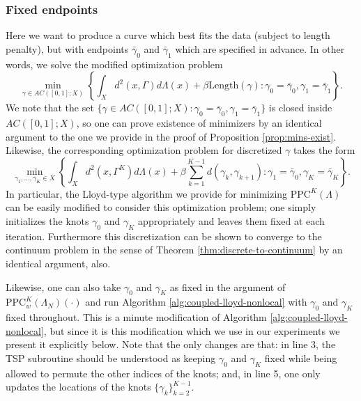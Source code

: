 \documentclass[aos, preprint]{imsart}
\theoremstyle{plain}
\theoremstyle{remark}
\begin{document}
\begin{appendix}
\subsubsection*{Fixed endpoints} Here we want to produce a
curve which best fits the data (subject to length penalty), but with
endpoints $\bar{\gamma}_{0}$ and $\bar{\gamma}_{1}$ which are specified
in advance. In other words, we solve the modified optimization problem
\[
\min_{\gamma\in AC([0,1];X)}\left\{ \int_{X}d^{2}(x,\Gamma)d\Lambda(x)+\beta\text{Length}(\gamma):\gamma_{0}=\bar{\gamma}_{0},\gamma_{1}=\bar{\gamma}_{1}\right\} .
\]
We note that the set $\{\gamma\in AC([0,1];X):\gamma_{0}=\bar{\gamma}_{0},\gamma_{1}=\bar{\gamma}_{1}\}$
is closed inside $AC([0,1];X)$, so
one can prove existence of minimizers by an identical argument to
the one we provide in the proof of Proposition \ref{prop:mins-exist}.
Likewise, the corresponding optimization problem for discretized $\gamma$
takes the form
\[
\min_{\gamma_{1},\ldots,\gamma_{K}\in X}\left\{ \int_{X}d^{2}(x,\Gamma^{K})d\Lambda(x)+\beta\sum_{k=1}^{K-1}d(\gamma_{k},\gamma_{k+1}):\gamma_{1}=\bar{\gamma}_{0},\gamma_{K}=\bar{\gamma}_{K}\right\} .
\]
In particular, the Lloyd-type algorithm we provide for minimizing
$\text{PPC}^{K}(\Lambda)$ can be easily modified to consider this
optimization problem; one simply initializes the knots $\gamma_{0}$
and $\gamma_{K}$ appropriately and leaves them fixed at each iteration. Furthermore this discretization can be shown to converge to the continuum problem in the sense of Theorem \ref{thm:discrete-to-continuum} by an identical argument, also.

Likewise, one can also take $\gamma_0$ and $\gamma_K$ as fixed in the argument of $\text{PPC}_w^K(\Lambda_N)(\cdot)$ and run Algorithm \ref{alg:coupled-lloyd-nonlocal} with $\gamma_0$ and $\gamma_K$ fixed throughout. This is a minute modification of Algorithm \ref{alg:coupled-lloyd-nonlocal}, but since it is this modification which we use in our experiments we present it explicitly below. Note that the only changes are that: in line 3, the TSP subroutine should be understood as keeping $\gamma_0$ and $\gamma_K$ fixed while being allowed to permute the other indices of the knots; and, in line 5, one only updates the locations of the knots $\{\gamma_k\}_{k=2}^{K-1}$.

\begin{algorithm}[H]
  \caption{Nonlocal, Fixed-Endpoint Coupled Lloyd's Algorithm}\label{alg:coupled-lloyd-nonlocal-fixed}


\end{algorithm}
\end{appendix}
\end{document}
